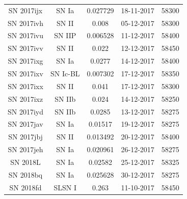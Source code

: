 \documentclass[a4paper,oneside,12pt, class=Latex/Classes/PhDthesisPSnPDF, crop=false]{standalone}
\begin{document}
\begin{longtable}{ccccc}
 SN 2017ijx & SN Ia & 0.027729 & 18-11-2017 & 58300 \\
 SN 2017ivh & SN II & 0.008 & 05-12-2017 & 58300 \\
 SN 2017ivu & SN IIP & 0.006528 & 11-12-2017 & 58400 \\
 SN 2017ivv & SN II & 0.022 & 12-12-2017 & 58450 \\
 SN 2017ixg & SN Ia & 0.0277 & 14-12-2017 & 58400 \\
 SN 2017ixv & SN Ic-BL & 0.007302 & 17-12-2017 & 58350 \\
 SN 2017ixx & SN II & 0.041 & 17-12-2017 & 58300 \\
 SN 2017ixz & SN IIb & 0.024 & 14-12-2017 & 58250 \\
 SN 2017iyd & SN IIb & 0.0285 & 13-12-2017 & 58275 \\
 SN 2017jav & SN Ia & 0.01517 & 19-12-2017 & 58275 \\
 SN 2017jbj & SN II & 0.013492 & 20-12-2017 & 58400 \\
 SN 2017jeh & SN Ia & 0.020961 & 26-12-2017 & 58275 \\
 SN 2018L & SN Ia & 0.02582 & 25-12-2017 & 58325 \\
 SN 2018bq & SN Ia & 0.025628 & 30-12-2017 & 58275 \\
 SN 2018fd & SLSN I & 0.263 & 11-10-2017 & 58450 \\
\end{longtable}
\end{document}
